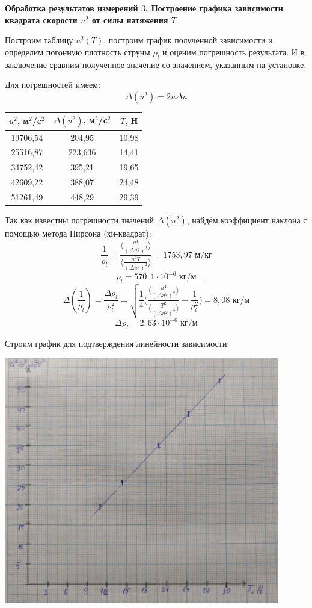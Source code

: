 \documentclass[a4paper, 12pt]{article} %
\begin{document}
{\bf Обработка результатов измерений $3$. Построение графика зависимости квадрата скорости $u^2$ от силы натяжения
$T$}

Построим таблицу $u^2(T)$, построим график полученной зависимости и определим погонную плотность струны $\rho_l$ и оценим погрешность результата. И в заключение сравним полученное значение со значением, указанным на установке.

Для погрешностей имеем:
\[\Delta (u^2) = 2u\Delta u\]

\begin{center}
\begin{tabular}{|c|c|c|}
\hline 
$u^2$, м$^2$/c$^2$ & $\Delta (u^2)$, м$^2$/c$^2$& $T$, Н \\ 
\hline 
19706,54 &204,95& 10,98 \\ 
\hline 
25516,87 &223,636& 14,41 \\ 
\hline 
34752,42 &395,21& 19,65 \\ 
\hline 
42609,22 &388,07& 24,48 \\ 
\hline 
51261,49 &448,29& 29,39 \\ 
\hline 
\end{tabular} 
\end{center}

Так как известны погрешности значений $\Delta (u^2)$, найдём коэффициент наклона с помощью метода Пирсона (хи-квадрат):
\[\frac{1}{\rho_l} = \frac{\langle \frac{u^4}{(\Delta u^2)^2} \rangle}{\langle \frac{u^2 T}{(\Delta u^2)^2} \rangle}  = 1753,97 \text{ м/кг}\]
\[\rho_l = 570,1 \cdot 10^{-6} \text{ кг/м}\]
\[\Delta (\frac{1}{\rho_l}) = \frac{\Delta \rho_l}{\rho^2_l} = \sqrt{\frac{1}{4} \Big( \frac{\langle \frac{u^4}{(\Delta u^2)^2} \rangle}{\langle \frac{T^2}{(\Delta u^2)^2} \rangle}  - \frac{1}{\rho_l^2}\Big)} = 8,08 \text{ кг/м}\]
\[\Delta \rho_l = 2,63  \cdot 10^{-6} \text{ кг/м}\]

Строим график для подтверждения линейности зависимости:

\begin{center}
    \includegraphics[width = 12cm]{1.4.5 10}
\end{center}
\end{document}
